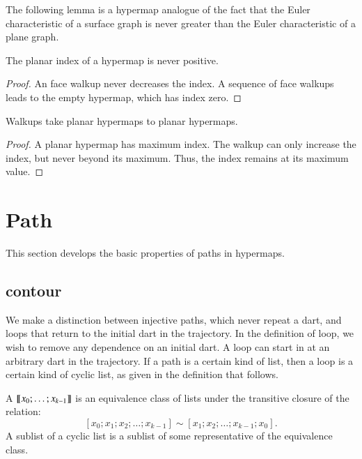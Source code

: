 The following lemma is a hypermap analogue of the fact that the Euler characteristic
of a surface graph is never greater than the Euler characteristic of a plane graph.

\begin{lemma}
\label{lemma:planar-nonpos}  
The planar index
of a hypermap is never positive.
\end{lemma}

\begin{proof}  An face walkup never decreases the index.  A sequence
of face walkups leads to the empty hypermap, which has
index zero.
\end{proof}


\begin{lemma}
\label{lemma:walkup-planar}
Walkups take planar hypermaps to planar
hypermaps.
\end{lemma}

\begin{proof}  
A planar hypermap has maximum index.  The walkup
can only increase the index, but never beyond its maximum.  
Thus, the index remains at its maximum value.
\end{proof}





\section{Path}

This section develops the basic properties of paths in hypermaps.


\subsection{contour}

We make a distinction between injective paths, which never
repeat a dart, and loops that return to the initial dart in the trajectory.
In the definition of loop, we wish to remove any dependence on an initial dart.
A loop can start in at an arbitrary dart in the trajectory.  If a path is a certain
kind of list, then a loop is a certain kind of cyclic list, as given in the
definition that follows.

\begin{definition}\label{def:cyclic:list}
   
  A  ${\llbracket{x_0;\ldots;x_{k-1}}\rrbracket}$ is an equivalence
  class of lists under the transitive closure of the relation:
\[ 
[x_0;x_1;x_2;\ldots;x_{k-1}] \sim [x_1;x_2;\ldots;x_{k-1};x_0].
\] 
A sublist of a cyclic list is a sublist of some representative of the
equivalence class.
\end{definition}

